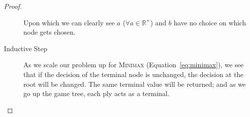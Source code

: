 \documentclass[12pt]{scrartcl}
\begin{document}
\begin{proof}
\begin{description}
        Upon which we can clearly see $a$ ($\forall a \in \mathbb{R}^+$) and $b$ have no choice on which node gets chosen.

    \item[Inductive Step] As we scale our problem up for \textsc{Minimax} (Equation~\ref{eq:minimax}), we see that if the decision of the terminal node is unchanged, the decision at the root will be changed. The same terminal value will be returned; and as we go up the game tree, each ply acts as a terminal.
\end{description}

\end{proof}
\end{document}
